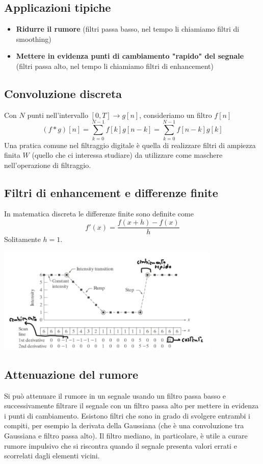 \documentclass[12pt, a4paper]{report}
\begin{document}
\subsection{Applicazioni tipiche}
\begin{itemize}
    \item \textbf{Ridurre il rumore} (filtri passa basso, nel tempo li chiamiamo filtri di smoothing)
    \item \textbf{Mettere in evidenza punti di cambiamento "rapido" del segnale} (filtri passa alto, nel tempo li chiamiamo filtri di enhancement)
\end{itemize}
\subsection{Convoluzione discreta}
Con $N$ punti nell'intervallo $[0,T]\rightarrow g[n]$, consideriamo un filtro $f[n]$
\begin{equation*}
    (f*g)[n] = \sum_{k=0}^{N-1} f[k]g[n-k] = \sum_{k=0}^{N-1} f[n-k]g[k]
\end{equation*}
Una pratica comune nel filtraggio digitale è quella di realizzare filtri di ampiezza finita $W$ (quello che ci interessa studiare) da utilizzare come maschere nell'operazione di filtraggio.
\subsection{Filtri di enhancement e differenze finite}
In matematica discreta le differenze finite sono definite come
\begin{equation*}
    f'(x) = \frac{f(x+h)-f(x)}{h}
\end{equation*}
Solitamente $h=1$.
\begin{center}
    \includegraphics[width=0.8\textwidth]{Immagini/differenzefinite.png}
\end{center}
\subsection{Attenuazione del rumore}
Si può attenuare il rumore in un segnale usando un filtro passa basso e successivamente filtrare il segnale con un filtro passa alto per mettere in evidenza i punti di cambiamento. Esistono filtri che sono in grado di svolgere entrambi i compiti, per esempio la derivata della Gaussiana (che è una convoluzione tra Gaussiana e filtro passa alto). Il filtro mediano, in particolare, è utile a curare rumore impulsivo che si riscontra quando il segnale presenta valori errati e scorrelati dagli elementi vicini.
\end{document}
